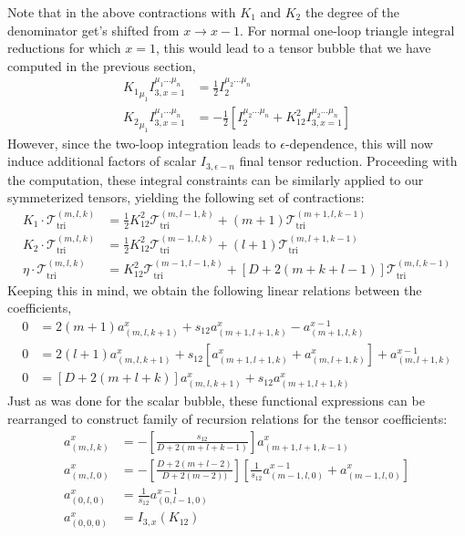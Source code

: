 \documentclass[12pt,letter]{article}
\begin{document}
Note that in the above contractions with $K_1$ and $K_2$ the degree of the denominator get's shifted from $x\rightarrow x-1$. For normal one-loop triangle integral reductions for which $x=1$, this would lead to a tensor bubble that we have computed in the previous section,
\begin{align}
{K_1}_{\mu_1}I^{\mu_1\dots \mu_n}_{3,x=1}& = \frac{1}{2}I^{\mu_2\dots \mu_n}_{2}
\\
{K_2}_{\mu_1}I^{\mu_1\dots \mu_n}_{3,x=1}& = -\frac{1}{2}\left[I^{\mu_2\dots \mu_n}_{2}+K_{12}^2 I^{\mu_2\dots \mu_n}_{3,x=1}\right]
\end{align}
 However, since the two-loop integration leads to $\epsilon$-dependence, this will now induce additional factors of scalar $I_{3,\epsilon - n}$ final tensor reduction. Proceeding with the computation, these integral constraints can be similarly applied to our symmeterized tensors, yielding the following set of contractions:
\begin{align}
K_1\cdot \mathcal{T}^{(m,l,k)}_{\text{tri}} &=\frac{1}{2}K_{12}^2\mathcal{T}^{(m,l-1,k)}_{\text{tri}} + (m+1)\mathcal{T}^{(m+1,l,k-1)}_{\text{tri}} 
\\
K_2\cdot \mathcal{T}^{(m,l,k)}_{\text{tri}} &=\frac{1}{2}K_{12}^2\mathcal{T}^{(m-1,l,k)}_{\text{tri}} +(l+1)\mathcal{T}^{(m,l+1,k-1)}_{\text{tri}} 
\\
\eta\cdot  \mathcal{T}^{(m,l,k)}_{\text{tri}} &= K_{12}^2\mathcal{T}^{(m-1,l-1,k)}_{\text{tri}} +\left[D+2(m+k+l-1)\right]\mathcal{T}^{(m,l,k-1)}_{\text{tri}} 
\end{align}
Keeping this in mind, we obtain the following linear relations between the coefficients,
\begin{equation}
\begin{aligned}
0&=2(m+1)a_{(m,l,k+1)}^{x}+s_{12}a_{(m+1,l+1,k)}^{x}-a_{(m+1,l,k)}^{x-1}
\\
0&=2(l+1)a_{(m,l,k+1)}^{x}+s_{12}[a_{(m+1,l+1,k)}^{x}+a_{(m,l+1,k)}^{x}]+a_{(m,l+1,k)}^{x-1}
\\
0&=[D+2(m+l+k)]a_{(m,l,k+1)}^{x}+s_{12}a_{(m+1,l+1,k)}^{x}
\end{aligned}
\end{equation}
Just as was done for the scalar bubble, these functional expressions can be rearranged to construct family of recursion relations for the tensor coefficients:
\begin{equation}\label{eq:triRed}
\boxed{
\begin{aligned}
a_{(m,l,k)}^x&=-\left[\frac{s_{12}}{D+2(m+l+k-1)}\right]a_{(m+1,l+1,k-1)}^x
\\
a_{(m,l,0)}^x&=-\left[\frac{D+2(m+l-2)}{D+2(m-2))}\right]\left[\frac{1}{s_{12}} a^{x-1}_{(m-1,l,0)}+a^{x}_{(m-1,l,0)}\right]
\\
a^x_{(0,l,0)}&= \frac{1}{s_{12}} a_{(0,l-1,0)}^{x-1} 
\\
a^x_{(0,0,0)} &= I_{3,x}(K_{12})
\end{aligned}
}
\end{equation}
\end{document}
